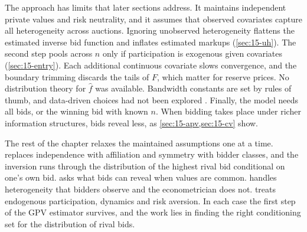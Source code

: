 The approach has limits that later sections address. It maintains independent private values and risk neutrality, and it assumes that observed covariates capture all heterogeneity across auctions. Ignoring unobserved heterogeneity flattens the estimated inverse bid function and inflates estimated markups (\cref{sec:15-uh}). The second step pools across $n$ only if participation is exogenous given covariates (\cref{sec:15-entry}). Each additional continuous covariate slows convergence, and the boundary trimming discards the tails of $F$, which matter for reserve prices. No distribution theory for $\hat f$ was available. Bandwidth constants are set by rules of thumb, and data-driven choices had not been explored \citep[Section 3.2.1]{AtheyHaile2007}. Finally, the model needs all bids, or the winning bid with known $n$. When bidding takes place under richer information structures, bids reveal less, as \cref{sec:15-apv,sec:15-cv} show.

The rest of the chapter relaxes the maintained assumptions one at a time.  replaces independence with affiliation and symmetry with bidder classes, and the inversion runs through the distribution of the highest rival bid conditional on one's own bid.  asks what bids can reveal when values are common.  handles heterogeneity that bidders observe and the econometrician does not.  treats endogenous participation, dynamics and risk aversion. In each case the first step of the GPV estimator survives, and the work lies in finding the right conditioning set for the distribution of rival bids.
